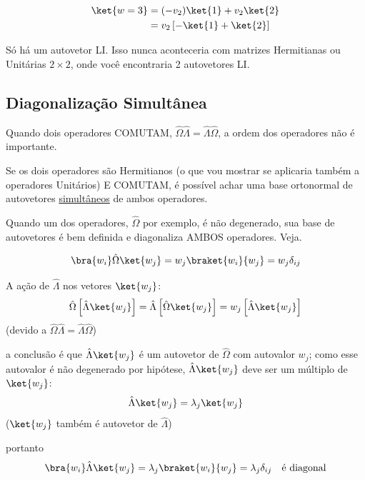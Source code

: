 \begin{align}
    \ket{w=3} &= (-v_2)\ket{1} + v_2\ket{2} \notag \\
    &= v_2 \left[ -\ket{1} + \ket{2} \right]
\end{align}

Só há um autovetor LI. Isso nunca aconteceria com matrizes Hermitianas ou Unitárias $2\times 2$, onde você encontraria 2 autovetores LI.

\subsection*{Diagonalização Simultânea}

Quando dois operadores COMUTAM, $\hat{\Omega}\hat{\Lambda} = \hat{\Lambda}\hat{\Omega}$, a ordem dos operadores não é importante.

Se os dois operadores são Hermitianos (o que vou mostrar se aplicaria também a operadores Unitários) E COMUTAM, é possível achar uma base ortonormal de autovetores \underline{simultâneos} de ambos operadores.

Quando um dos operadores, $\hat{\Omega}$ por exemplo, é não degenerado, sua base de autovetores é bem definida e diagonaliza AMBOS operadores. Veja.

\begin{equation}
    \bra{w_i}\hat{\Omega}\ket{w_j} = w_j \braket{w_i}{w_j} = w_j \delta_{ij}
\end{equation}

A ação de $\hat{\Lambda}$ nos vetores $\ket{w_j}$:
\begin{equation}
    \hat{\Omega}\left[\hat{\Lambda}\ket{w_j}\right] = \hat{\Lambda}\left[\hat{\Omega}\ket{w_j}\right] = w_j \left[\hat{\Lambda}\ket{w_j}\right]
\end{equation}
(devido a $\hat{\Omega}\hat{\Lambda} = \hat{\Lambda}\hat{\Omega}$)

a conclusão é que $\hat{\Lambda}\ket{w_j}$ é um autovetor de $\hat{\Omega}$ com autovalor $w_j$; como esse autovalor é não degenerado por hipótese, $\hat{\Lambda}\ket{w_j}$ deve ser um múltiplo de $\ket{w_j}$:
\begin{equation}
    \hat{\Lambda}\ket{w_j} = \lambda_j \ket{w_j}
\end{equation}
($\ket{w_j}$ também é autovetor de $\hat{\Lambda}$)

portanto
\begin{equation}
    \bra{w_i}\hat{\Lambda}\ket{w_j} = \lambda_j \braket{w_i}{w_j} = \lambda_j \delta_{ij} \quad \text{é diagonal}
\end{equation}

